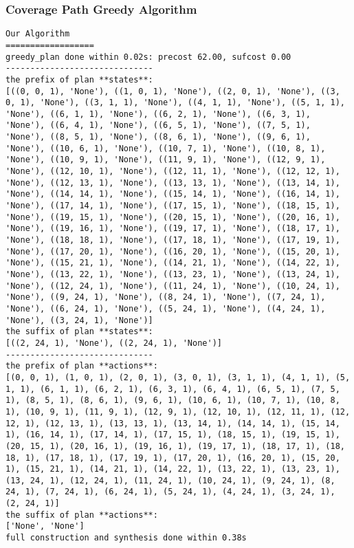 \subsubsection*{Coverage Path Greedy Algorithm}
\begin{lstlisting}
Our Algorithm
==================
greedy_plan done within 0.02s: precost 62.00, sufcost 0.00
------------------------------
the prefix of plan **states**:
[((0, 0, 1), 'None'), ((1, 0, 1), 'None'), ((2, 0, 1), 'None'), ((3, 0, 1), 'None'), ((3, 1, 1), 'None'), ((4, 1, 1), 'None'), ((5, 1, 1), 'None'), ((6, 1, 1), 'None'), ((6, 2, 1), 'None'), ((6, 3, 1), 'None'), ((6, 4, 1), 'None'), ((6, 5, 1), 'None'), ((7, 5, 1), 'None'), ((8, 5, 1), 'None'), ((8, 6, 1), 'None'), ((9, 6, 1), 'None'), ((10, 6, 1), 'None'), ((10, 7, 1), 'None'), ((10, 8, 1), 'None'), ((10, 9, 1), 'None'), ((11, 9, 1), 'None'), ((12, 9, 1), 'None'), ((12, 10, 1), 'None'), ((12, 11, 1), 'None'), ((12, 12, 1), 'None'), ((12, 13, 1), 'None'), ((13, 13, 1), 'None'), ((13, 14, 1), 'None'), ((14, 14, 1), 'None'), ((15, 14, 1), 'None'), ((16, 14, 1), 'None'), ((17, 14, 1), 'None'), ((17, 15, 1), 'None'), ((18, 15, 1), 'None'), ((19, 15, 1), 'None'), ((20, 15, 1), 'None'), ((20, 16, 1), 'None'), ((19, 16, 1), 'None'), ((19, 17, 1), 'None'), ((18, 17, 1), 'None'), ((18, 18, 1), 'None'), ((17, 18, 1), 'None'), ((17, 19, 1), 'None'), ((17, 20, 1), 'None'), ((16, 20, 1), 'None'), ((15, 20, 1), 'None'), ((15, 21, 1), 'None'), ((14, 21, 1), 'None'), ((14, 22, 1), 'None'), ((13, 22, 1), 'None'), ((13, 23, 1), 'None'), ((13, 24, 1), 'None'), ((12, 24, 1), 'None'), ((11, 24, 1), 'None'), ((10, 24, 1), 'None'), ((9, 24, 1), 'None'), ((8, 24, 1), 'None'), ((7, 24, 1), 'None'), ((6, 24, 1), 'None'), ((5, 24, 1), 'None'), ((4, 24, 1), 'None'), ((3, 24, 1), 'None')]
the suffix of plan **states**:
[((2, 24, 1), 'None'), ((2, 24, 1), 'None')]
------------------------------
the prefix of plan **actions**:
[(0, 0, 1), (1, 0, 1), (2, 0, 1), (3, 0, 1), (3, 1, 1), (4, 1, 1), (5, 1, 1), (6, 1, 1), (6, 2, 1), (6, 3, 1), (6, 4, 1), (6, 5, 1), (7, 5, 1), (8, 5, 1), (8, 6, 1), (9, 6, 1), (10, 6, 1), (10, 7, 1), (10, 8, 1), (10, 9, 1), (11, 9, 1), (12, 9, 1), (12, 10, 1), (12, 11, 1), (12, 12, 1), (12, 13, 1), (13, 13, 1), (13, 14, 1), (14, 14, 1), (15, 14, 1), (16, 14, 1), (17, 14, 1), (17, 15, 1), (18, 15, 1), (19, 15, 1), (20, 15, 1), (20, 16, 1), (19, 16, 1), (19, 17, 1), (18, 17, 1), (18, 18, 1), (17, 18, 1), (17, 19, 1), (17, 20, 1), (16, 20, 1), (15, 20, 1), (15, 21, 1), (14, 21, 1), (14, 22, 1), (13, 22, 1), (13, 23, 1), (13, 24, 1), (12, 24, 1), (11, 24, 1), (10, 24, 1), (9, 24, 1), (8, 24, 1), (7, 24, 1), (6, 24, 1), (5, 24, 1), (4, 24, 1), (3, 24, 1), (2, 24, 1)]
the suffix of plan **actions**:
['None', 'None']
full construction and synthesis done within 0.38s 
\end{lstlisting}


